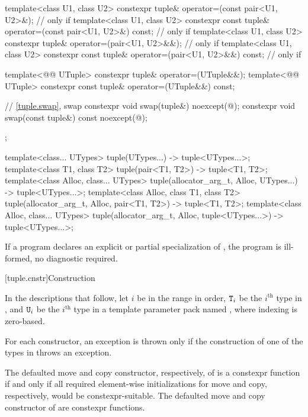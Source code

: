 \begin{codeblock}
{{    template<class U1, class U2>
      constexpr tuple& operator=(const pair<U1, U2>&);          // only if 
    template<class U1, class U2>
      constexpr const tuple& operator=(const pair<U1, U2>&) const;
                                                                // only if 
    template<class U1, class U2>
      constexpr tuple& operator=(pair<U1, U2>&&);               // only if 
    template<class U1, class U2>
      constexpr const tuple& operator=(pair<U1, U2>&&) const;   // only if 

    template<@@ UTuple>
      constexpr tuple& operator=(UTuple&&);
    template<@@ UTuple>
      constexpr const tuple& operator=(UTuple&&) const;

    // \ref{tuple.swap},  swap
    constexpr void swap(tuple&) noexcept(@\seebelow@);
    constexpr void swap(const tuple&) const noexcept(@\seebelow@);
  };

  template<class... UTypes>
    tuple(UTypes...) -> tuple<UTypes...>;
  template<class T1, class T2>
    tuple(pair<T1, T2>) -> tuple<T1, T2>;
  template<class Alloc, class... UTypes>
    tuple(allocator_arg_t, Alloc, UTypes...) -> tuple<UTypes...>;
  template<class Alloc, class T1, class T2>
    tuple(allocator_arg_t, Alloc, pair<T1, T2>) -> tuple<T1, T2>;
  template<class Alloc, class... UTypes>
    tuple(allocator_arg_t, Alloc, tuple<UTypes...>) -> tuple<UTypes...>;
}
\end{codeblock}

\pnum
If a program declares an explicit or partial specialization of ,
the program is ill-formed, no diagnostic required.

[tuple.cnstr]{Construction}

\pnum
In the descriptions that follow, let $i$ be in the range
 in order, $\texttt{\protect T}_i$
be the $i^\text{th}$ type in , and
$\texttt{\protect U}_i$ be the $i^\text{th}$ type in a template parameter pack named , where indexing
is zero-based.

\pnum
For each  constructor, an exception is thrown only if the construction of
one of the types in  throws an exception.

\pnum
The defaulted move and copy constructor, respectively, of
 is a constexpr function if and only if all
required element-wise initializations for move and copy, respectively,
would be constexpr-suitable.
The defaulted move and copy constructor of  are
constexpr functions.

